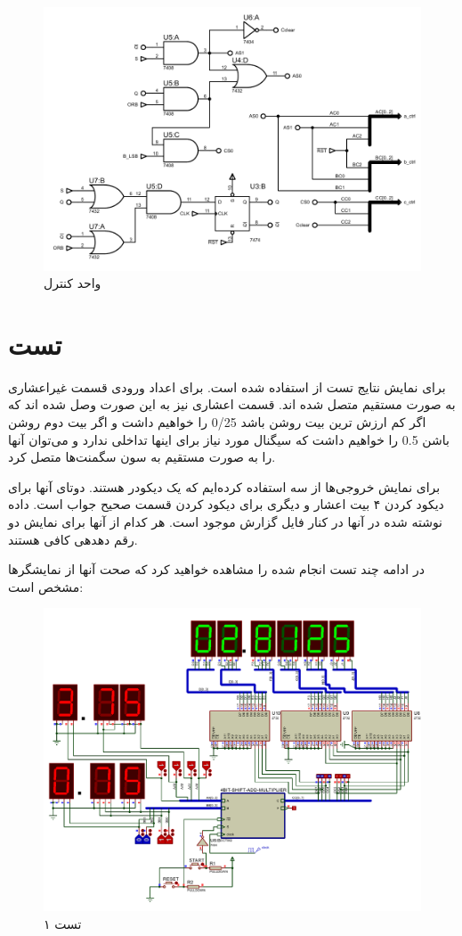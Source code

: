 \documentclass{article}
\begin{document}
\begin{figure}
	\centering
	\includegraphics[scale=0.7]{./graphics/CU}
	\caption{واحد کنترل}
\end{figure}


\section{تست}
برای نمایش نتایج تست از  استفاده شده است. برای اعداد ورودی قسمت غیراعشاری به صورت مستقیم متصل شده اند. قسمت اعشاری نیز به این صورت وصل شده اند که اگر کم ارزش ترین بیت روشن باشد 0/25 را خواهیم داشت و اگر بیت دوم روشن باشن 0.5 را خواهیم داشت که سیگنال مورد نیاز برای اینها تداخلی ندارد و می‌توان آنها را به صورت مستقیم به سون سگمنت‌ها متصل کرد.

برای نمایش خروجی‌ها از سه  استفاده کرده‌ایم که یک دیکودر هستند. دوتای آنها برای دیکود کردن ۴ بیت اعشار و دیگری برای دیکود کردن قسمت صحیح جواب است. داده نوشته شده در آنها در کنار فایل گزارش موجود است. هر کدام از آنها برای نمایش دو رقم دهدهی کافی هستند.

در ادامه چند تست انجام شده را مشاهده خواهید کرد که صحت آنها از نمایشگرها مشخص است:

\begin{figure}
	\centering
	\includegraphics[scale=0.5]{./graphics/test1}
	\caption{تست ۱}
\end{figure}
\end{document}
